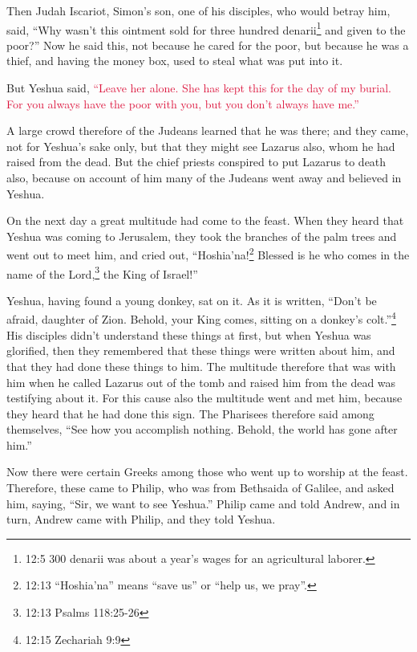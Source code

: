 \myverse{}Then Judah Iscariot, Simon’s son, one of his disciples, who would
betray him, said,
\myverse{}“Why wasn’t this ointment sold for three hundred denarii\footnote{12:5 300 denarii was about a year’s wages for an agricultural laborer.} and given to the poor?”
\myverse{}Now he said this, not because he cared for the poor, but because he was a thief,
and having the money box, used to steal what was put into it.

\myverse{}But Yeshua said,
\textcolor{crimson}{“Leave her alone. She has kept this for the day of my burial.
}
\myverse{}\textcolor{crimson}{For you always have the poor with you, but you don’t always have me.”}

\myverse{}A large crowd therefore of the Judeans learned that he was there;
and they came, not for Yeshua’s sake only, but that they might see Lazarus also, whom he had raised from
the dead.
\myverse{}But the chief priests conspired to put Lazarus to death also,
\myverse{}because on account of him many of the Judeans went away and believed in Yeshua.

\myverse{}On the next day a great multitude had come to the feast. When
they heard that Yeshua was coming to Jerusalem,
\myverse{}they took the branches of the palm trees and went out to meet him, and cried
out, “Hoshia'na!\footnote{12:13 “Hoshia'na” means “save us” or “help us, we pray”.} Blessed is he who comes in the name
of the Lord,\footnote{12:13 Psalms 118:25-26
} the King of Israel!”

\myverse{}Yeshua, having found a young donkey, sat on it. As it is written,
\myverse{}“Don’t be afraid, daughter of Zion. Behold, your King comes, sitting on a
donkey’s colt.”\footnote{12:15 Zechariah 9:9}
\myverse{}His disciples didn’t understand these things at first, but when Yeshua was
glorified, then they remembered that these things were written about him, and that they had done these
things to him.
\myverse{}The multitude therefore that was with him when he called Lazarus out of the
tomb and raised him from the dead was testifying about it.
\myverse{}For this cause also the multitude went and met him, because they heard that
he had done this sign.
\myverse{}The Pharisees therefore said among themselves, “See how you accomplish nothing.
Behold, the world has gone after him.”

\myverse{}Now there were certain Greeks among those who went up to worship
at the feast.
\myverse{}Therefore, these came to Philip, who was from Bethsaida of Galilee, and asked
him, saying, “Sir, we want to see Yeshua.”
\myverse{}Philip came and told Andrew, and in turn, Andrew came with Philip, and they
told Yeshua.

